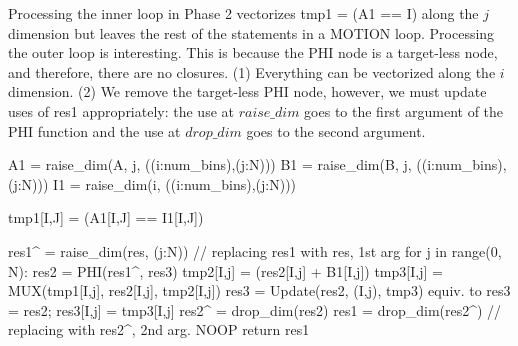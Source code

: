 Processing the inner loop in Phase 2 vectorizes {\sf tmp1 = (A1 == I)} along the $j$ dimension but leaves the rest of the statements in a MOTION loop. Processing the outer loop is interesting. This is because the PHI node is a target-less node, and therefore, there are no closures. (1) Everything can be vectorized along the $i$ dimension. (2) We remove the target-less PHI node, however, we must update uses of {\sf res1} appropriately: the use at $\mathit{raise\_dim}$ goes to the first argument of the PHI function and the use at $\mathit{drop\_dim}$ goes to the second argument.

{\small
\begin{pythonn}
A1 = raise_dim(A, j, ((i:num_bins),(j:N)))
B1 = raise_dim(B, j, ((i:num_bins),(j:N)))
I1 = raise_dim(i, ((i:num_bins),(j:N)))

tmp1[I,J] = (A1[I,J] == I1[I,J])

res1^ = raise_dim(res, (j:N)) // replacing res1 with res, 1st arg
for j in range(0, N):
   res2 = PHI(res1^, res3)
   tmp2[I,j] = (res2[I,j] + B1[I,j])
   tmp3[I,j] = MUX(tmp1[I,j], res2[I,j], tmp2[I,j])
   res3 = Update(res2, (I,j), tmp3)
   equiv. to res3 = res2; res3[I,j] = tmp3[I,j]
res2^ = drop_dim(res2)
res1 = drop_dim(res2^) // replacing with res2^, 2nd arg. NOOP
return res1
\end{pythonn}
}

